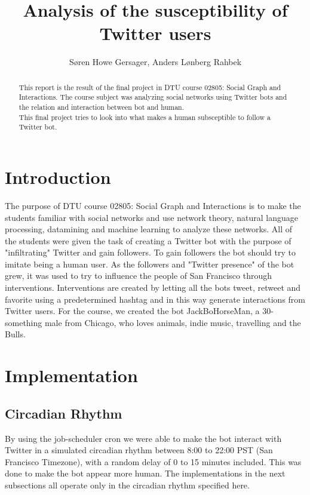 \documentclass[10pt]{IEEEtran}
\title{Analysis of the susceptibility of Twitter users}
\author{Søren Howe Gersager, Anders Lønberg Rahbek}
\begin{document}
\maketitle

\begin{abstract}
This report is the result of the final project in DTU course 02805: Social Graph and Interactions. The course subject was analyzing social networks using Twitter bots and the relation and interaction between bot and human. \\
This final project tries to look into what makes a human subsceptible to follow a Twitter bot.
\end{abstract}

\section{Introduction}
The purpose of DTU course 02805: Social Graph and Interactions is to make the students familiar with social networks and use network theory, natural language processing, datamining and machine learning to analyze these networks. All of the students were given the task of creating a Twitter bot with the purpose of "infiltrating" Twitter and gain followers. To gain followers the bot should try to imitate being a human user. As the followers and "Twitter presence" of the bot grew, it was used to try to influence the people of San Francisco through interventions. Interventions are created by letting all the bots tweet, retweet and favorite using a predetermined hashtag and in this way generate interactions from Twitter users. For the course, we created the bot JackBoHorseMan\cite{twitterprofile}, a 30-something male from Chicago, who loves animals, indie music, travelling and the Bulls.

\section{Implementation}
\subsection{Circadian Rhythm}
By using the job-scheduler cron we were able to make the bot interact with Twitter in a simulated circadian rhythm between 8:00 to 22:00 PST (San Francisco Timezone), with a random delay of 0 to 15 minutes included. This was done to make the bot appear more human.
The implementations in the next subsections all operate only in the circadian rhythm specified here.
\end{document}
